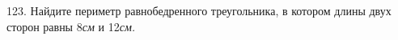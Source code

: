 123. Найдите периметр равнобедренного треугольника, в котором длины двух сторон равны 8{\it см} и 12{\it см.}\\
